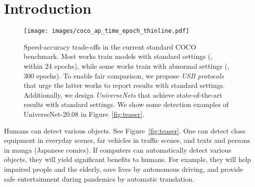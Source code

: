 \documentclass[10pt,twocolumn,letterpaper]{article}
\newcommand{\Univs}{UniverseNets\xspace}
\newcommand{\OurAugust}{UniverseNet-20.08\xspace}
\newcommand{\TB}{\textbf}
\begin{document}
\begin{abstract}
Benchmarks, such as COCO, play a crucial role in object detection.
However, existing benchmarks are insufficient in scale variation, and their protocols are inadequate for fair comparison.
In this paper, we introduce the \TB{Universal-Scale object detection Benchmark (USB)}.
USB has variations in object scales and image domains
by incorporating COCO with the recently proposed Waymo Open Dataset and Manga109-s dataset.
To enable fair comparison, we propose \TB{USB protocols}
by defining multiple thresholds for training epochs and evaluation image resolutions.
By analyzing methods on the proposed benchmark,
we designed fast and accurate object detectors called \TB{UniverseNets},
which surpassed all baselines on USB and achieved state-of-the-art results on existing benchmarks.
Specifically, UniverseNets achieved 54.1\% AP on COCO \texttt{test-dev} with 20 epochs training,
the top result among single-stage detectors on the Waymo Open Dataset Challenge 2020 2D detection,
and the first place in the NightOwls Detection Challenge 2020 all objects track.
The code is available at \UnivRepo.
\end{abstract}







\section{Introduction}
\label{sec:introduction}



\begin{figure}[t]
	\centering
	\texttt{[image: images/coco\_ap\_time\_epoch\_thinline.pdf]}
	\caption{
		Speed-accuracy trade-offs in the current standard COCO benchmark.
		Most works train models with standard settings (\eg, within 24 epochs),
		while some works train with abnormal settings (\eg, 300 epochs).
		To enable fair comparison,
		we propose \textit{USB protocols} that urge the latter works to report results with standard settings.
		Additionally, we design \textit{\Univs}
		that achieve state-of-the-art results with standard settings.
		We show some detection examples of \OurAugust in Figure~\ref{fig:teaser}.
	}
	\label{fig:coco_speed_accuracy}
	\vspace{-2mm}
\end{figure}



Humans can detect various objects. See Figure~\ref{fig:teaser}.
One can detect
close equipment in everyday scenes,
far vehicles in traffic scenes,
and texts and persons in manga (Japanese comics).
If computers can automatically detect various objects,
they will yield significant benefits to humans.
For example, they will
help impaired people and the elderly,
save lives by autonomous driving,
and provide safe entertainment during pandemics by automatic translation.
\end{document}
